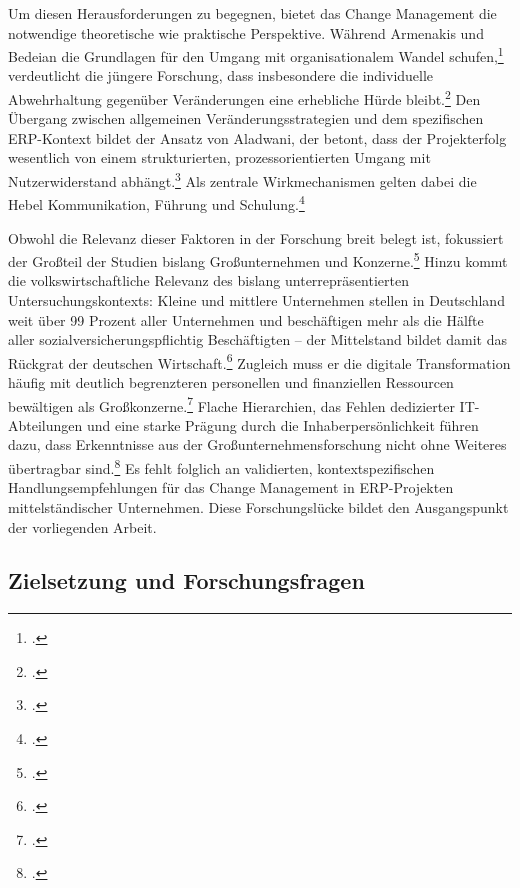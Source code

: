 Um diesen Herausforderungen zu begegnen, bietet das Change Management die notwendige theoretische wie praktische Perspektive. W\"ahrend Armenakis und Bedeian die Grundlagen f\"ur den Umgang mit organisationalem Wandel schufen,\footcite[Vgl.][S.~300--302]{armenakis1999} verdeutlicht die j\"ungere Forschung, dass insbesondere die individuelle Abwehrhaltung gegen\"uber Ver\"anderungen eine erhebliche H\"urde bleibt.\footcite[Vgl.][S.~162]{hubbart2023} Den \"Ubergang zwischen allgemeinen Ver\"anderungsstrategien und dem spezifischen ERP-Kontext bildet der Ansatz von Aladwani, der betont, dass der Projekterfolg wesentlich von einem strukturierten, prozessorientierten Umgang mit Nutzerwiderstand abh\"angt.\footcite[Vgl.][S.~266--275]{aladwani2001} Als zentrale Wirkmechanismen gelten dabei die Hebel Kommunikation, F\"uhrung und Schulung.\footcites[Vgl.][S.~285]{nah2001}[][S.~7--8]{butarbutar2023}

Obwohl die Relevanz dieser Faktoren in der Forschung breit belegt ist, fokussiert der Gro\ss{}teil der Studien bislang Gro\ss{}unternehmen und Konzerne.\footcite[Vgl.][S.~1--2]{haddara2011} Hinzu kommt die volkswirtschaftliche Relevanz des bislang unterrepr\"asentierten Untersuchungskontexts: Kleine und mittlere Unternehmen stellen in Deutschland weit \"uber 99 Prozent aller Unternehmen und besch\"aftigen mehr als die H\"alfte aller sozialversicherungspflichtig Besch\"aftigten -- der Mittelstand bildet damit das R\"uckgrat der deutschen Wirtschaft.\footcite[Vgl.]{ifm_bonn} Zugleich muss er die digitale Transformation h\"aufig mit deutlich begrenzteren personellen und finanziellen Ressourcen bew\"altigen als Gro\ss{}konzerne.\footcite[Vgl.][S.~28--29]{malhotra2010} Flache Hierarchien, das Fehlen dedizierter IT-Abteilungen und eine starke Pr\"agung durch die Inhaberpers\"onlichkeit f\"uhren dazu, dass Erkenntnisse aus der Gro\ss{}unternehmensforschung nicht ohne Weiteres \"ubertragbar sind.\footcite[Vgl.][S.~5--7]{haddara2011} Es fehlt folglich an validierten, kontextspezifischen Handlungsempfehlungen f\"ur das Change Management in ERP-Projekten mittelst\"andischer Unternehmen. Diese Forschungsl\"ucke bildet den Ausgangspunkt der vorliegenden Arbeit.

\subsection{Zielsetzung und Forschungsfragen}

